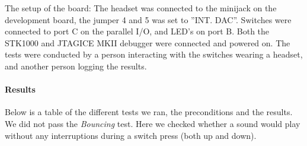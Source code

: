 \documentclass[a4paper,11pt]{article}
\begin{document}
The setup of the board: 
The headset was connected to the minijack on the development board, the jumper 4 and 5 was set to ''INT. DAC''.
Switches were connected to port C on the parallel I/O, and LED's on port B. 
Both the STK1000 and JTAGICE MKII debugger were connected and powered on. The tests were conducted by a person interacting with the switches wearing a headset, and another person logging the results.

\paragraph{Results}
Below is a table of the different tests we ran, the preconditions and the results. We did not pass the \emph{Bouncing} test. Here we checked whether a sound would play without any interruptions during a switch press (both up and down). 
\end{document}
